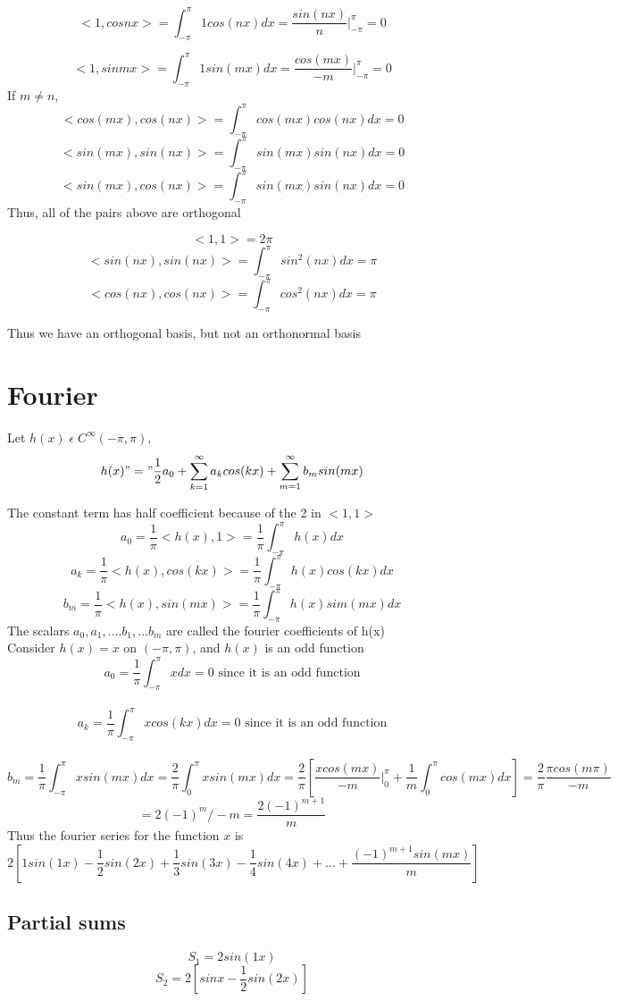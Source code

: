 \documentclass[11pt]{article}
\theoremstyle{definition}
\begin{document}
$$<1,cosnx> = \int^\pi_{-\pi} 1cos(nx)dx = \frac{sin(nx)}{n}|^{\pi}_{-\pi} = 0$$

$$<1,sinmx> = \int^\pi_{-\pi} 1sin(mx)dx =
\frac{cos(mx)}{-m}|^{\pi}_{-\pi} = 0$$
If $m \neq n$,
$$<cos(mx),cos(nx)> = \int^\pi_{-\pi} cos(mx)cos(nx)dx = 0$$
$$<sin(mx),sin(nx)> = \int^\pi_{-\pi} sin(mx)sin(nx)dx = 0$$
$$<sin(mx),cos(nx)> = \int^\pi_{-\pi} sin(mx)sin(nx)dx = 0$$
Thus,  all of the pairs above are orthogonal

$$<1,1> = 2\pi$$
$$<sin(nx), sin(nx)> = \int^\pi_{-\pi} sin^2(nx) dx = \pi$$ $$<cos(nx), cos(nx)> = \int^\pi_{-\pi} cos^2(nx) dx = \pi$$

Thus we have an orthogonal basis, but not an orthonormal basis
\section{Fourier}
Let $h(x)\; \epsilon\; C^\infty (-\pi, \pi)$,
$$h(x) "=" \frac{1}{2}a_0 + \sum ^\infty_{k=1}a_kcos(kx) + \sum ^\infty_{m=1}b_msin(mx)$$

The constant term has half coefficient because of the 2 in $<1,1>$
$$a_0 = \frac{1}{\pi}<h(x), 1> = \frac{1}{\pi}\int^\pi_{-\pi} h(x)dx$$
$$a_k = \frac{1}{\pi}<h(x), cos(kx)> = \frac{1}{\pi}\int^\pi_{-\pi} h(x)cos(kx)dx$$
$$b_m = \frac{1}{\pi}<h(x), sin(mx)> = \frac{1}{\pi}\int^\pi_{-\pi} h(x)sim(mx)dx$$
The scalars $a_0, a_1, ....b_1, ...b_m$ are called the fourier coefficients of h(x)\\
Consider $h(x) = x$ on $(-\pi, \pi)$, and $h(x)$ is an odd function\\
$$a_0 = \frac{1}{\pi}\int^\pi_{-\pi}xdx = 0 \text{ since it is an odd function}$$\\
$$a_k = \frac{1}{\pi}\int^\pi_{-\pi}xcos(kx)dx = 0 \text{ since it is an odd function}$$\\
$$b_m = \frac{1}{\pi}\int^\pi_{-\pi}xsin(mx)dx = \frac{2}{\pi}\int^\pi_{0}xsin(mx)dx = \frac{2}{\pi}[\frac{xcos(mx)}{-m}|_0^\pi + \frac{1}{m}\int^\pi_0cos(mx)dx] = \frac{2}{\pi}\frac{\pi cos(m\pi)}{-m}$$
$$= 2(-1)^m/-m = \frac{2(-1)^{m+1}}{m}$$
Thus the fourier series for the function $x$ is
$$2[1sin(1x) -\frac{1}{2}sin(2x) + \frac{1}{3}sin(3x) -\frac{1}{4}sin(4x)+\dots + \frac{(-1)^{m+1}sin(mx)}{m}]$$
\subsection{Partial sums}
$$S_1 = 2sin(1x)$$
$$S_2 = 2[sinx - \frac{1}{2}sin(2x)]$$
\end{document}
